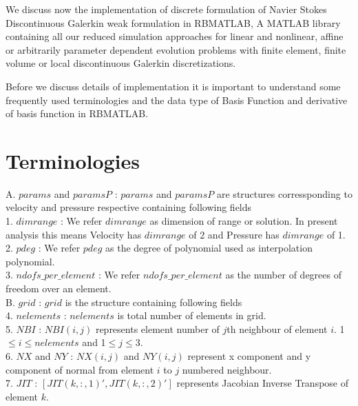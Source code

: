 \documentclass[a4paper,10pt]{book}
\begin{document}
We discuss now the implementation of discrete formulation of Navier Stokes Discontinuous Galerkin weak formulation in RBMATLAB, A MATLAB library containing all our reduced simulation approaches for linear and nonlinear, affine or arbitrarily parameter dependent evolution problems with finite element, finite volume or local discontinuous Galerkin discretizations. 

Before we discuss details of implementation it is important to understand some frequently used terminologies and the data type of Basis Function and derivative of basis function in RBMATLAB.

\section{Terminologies}


A. $params$ and $paramsP$ : $params$ and $paramsP$ are structures corressponding to velocity and pressure respective containing following fields\\

1. $dimrange$ : We refer $dimrange$ as dimension of range or solution. In present analysis this means Velocity has $dimrange$ of 2 and Pressure has $dimrange$ of 1.\\

2. $pdeg$ : We refer $pdeg$ as the degree of polynomial used as interpolation polynomial.\\

3. $ndofs\_per\_element$ : We refer $ndofs\_per\_element$ as the number of degrees of freedom over an element. \\

B. $grid$ : $grid$ is the structure containing following fields\\

4. $nelements$ : $nelements$ is total number of elements in grid.\\

5. $NBI$ : $NBI(i,j)$ represents element number of $j$th neighbour of element $i$. 1$\leq i \leq nelements$ and 1$\leq j \leq$3.\\

6. $NX$ and $NY$ : $NX(i,j)$ and $NY(i,j)$ represent x component and y component of normal from  element $i$ to $j$ numbered neighbour.\\

7. $JIT$ : $[JIT(k,:,1)',JIT(k,:,2)']$ represents Jacobian Inverse Transpose of element $k$.\\
\end{document}
